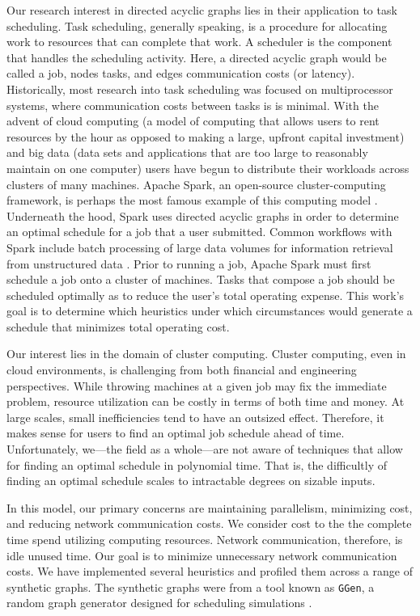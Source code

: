 \documentclass[11pt, oneside]{article}   	%
\def\code#1{\texttt{#1}}
\begin{document}
Our research interest in directed acyclic graphs lies in their application to task scheduling.  Task scheduling, generally speaking, is a procedure for allocating work to resources that can complete that work. A scheduler is the component that handles the scheduling activity. Here, a directed acyclic graph would be called a job, nodes tasks, and edges communication costs (or latency). Historically, most research into task scheduling was focused on multiprocessor systems, where communication costs between tasks is is minimal. With the advent of cloud computing (a model of computing that allows users to rent resources by the hour as opposed to making a large, upfront capital investment) and big data (data sets and applications that are too large to reasonably maintain on one computer) users have begun to distribute their workloads across clusters of many machines. Apache Spark, an open-source cluster-computing framework, is perhaps the most famous example of this computing model \cite{spark}. Underneath the hood, Spark uses directed acyclic graphs in order to determine an optimal  schedule for a job that a user submitted. Common workflows with Spark include batch processing of large data volumes for information retrieval from unstructured data \cite{spark-fb}. Prior to running a job, Apache Spark must first schedule a job onto a cluster of machines. Tasks that compose a job should be scheduled optimally as to reduce the user's total operating expense. This work's goal is to determine which heuristics under which circumstances would generate a schedule that minimizes total operating cost.

Our interest lies in the domain of cluster computing. Cluster computing, even in cloud environments, is challenging from both financial and engineering perspectives. While throwing machines at a given job may fix the immediate problem, resource utilization can be costly in terms of both time and money. At large scales, small inefficiencies tend to have an outsized effect. Therefore, it makes sense for users to find an optimal job schedule ahead of time. Unfortunately, we---the field as a whole---are not aware of techniques that allow for finding an optimal schedule in polynomial time. That is, the difficultly of finding an optimal schedule scales to intractable degrees on sizable inputs.

In this model, our primary concerns are maintaining parallelism, minimizing cost, and reducing network communication costs. We consider cost to the the complete time spend utilizing computing resources. Network communication, therefore, is idle unused time. Our goal is to minimize unnecessary network communication costs. We have implemented several heuristics and profiled them across a range of synthetic graphs. The synthetic graphs were from a tool known as \code{GGen}, a random graph generator designed for scheduling simulations \cite{ggen}.
\end{document}
